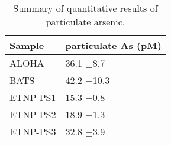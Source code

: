 \begin{table}[ht]
\centering
\begingroup\fontsize{7pt}{8pt}\selectfont
\begin{tabular}{p{1.2cm}p{2cm}}
  \hline
Sample & particulate As (pM) \\ 
  \hline
ALOHA & 36.1  $\pm$8.7 \\ 
  BATS & 42.2  $\pm$10.3 \\ 
  ETNP-PS1 & 15.3  $\pm$0.8 \\ 
  ETNP-PS2 & 18.9  $\pm$1.3 \\ 
  ETNP-PS3 & 32.8  $\pm$3.9 \\ 
   \hline
\end{tabular}
\endgroup
\caption{\label{QuanSummaryTable}Summary of quantitative results of particulate arsenic.} 
\end{table}
